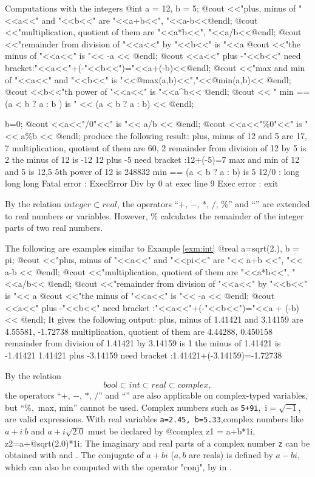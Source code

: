 \documentclass[a4paper,twoside,12pt]{book}
\begin{document}
\begin{example} Computations with the integers
\label{exm:int}
\bFF
@int a = 12, b = 5;
@cout <<"plus, minus of "<<a<<" and "<<b<<" are "<<a+b<<", "<<a-b<<@endl;
@cout <<"multiplication, quotient of them are "<<a*b<<", "<<a/b<<@endl;
@cout <<"remainder from division of "<<a<<" by "<<b<<" is "<<a%
@cout <<"the minus of "<<a<<" is "<< -a << @endl;
@cout <<a<<" plus -"<<b<<" need bracket:"<<a<<"+(-"<<b<<")="<<a+(-b)<<@endl;
@cout <<"max and min of "<<a<<" and "<<b<<" is "<<@max(a,b)<<","<<@min(a,b)<< @endl;
@cout <<b<<"th power of "<<a<<" is "<<a^b<< @endl;
@cout << " min  == (a < b ? a : b )  is " << (a < b ? a : b) << @endl;

b=0;
@cout <<a<<"/0"<<" is "<< a/b << @endl;
@cout <<a<<"\%0"<<" is "<< a\%b << @endl;
\eFF
produce the following result:
\bFF
plus, minus of 12 and 5 are 17, 7
multiplication, quotient of them are 60, 2
remainder from division of 12 by 5 is 2
the minus of 12 is -12
12 plus -5 need bracket :12+(-5)=7
max and min of 12 and 5 is 12,5
5th power of 12 is 248832
min == (a < b ? a : b)   is 5
12/0 : long long long
Fatal error : ExecError  Div by 0 at exec line  9
Exec error : exit
\eFF
\end{example}

By the relation $integer\subset real$, the operators
``$+,\, -,\, *,\, /,\, \%$'' and ``''
are extended to real numbers or variables. However,  $\%$
calculates the remainder of the integer parts of two real numbers.

The following are examples similar to Example \ref{exm:int}
\bFF
@real a=sqrt(2.), b = pi;
@cout <<"plus, minus of "<<a<<" and "<<pi<<" are "<< a+b <<", "<< a-b << @endl;
@cout <<"multiplication, quotient of them are "<<a*b<<", "<<a/b<< @endl;
@cout <<"remainder from division of "<<a<<" by "<<b<<" is "<< a%
@cout <<"the minus of "<<a<<" is "<< -a << @endl;
@cout <<a<<" plus -"<<b<<" need bracket :"<<a<<"+(-"<<b<<")="<<a + (-b) << @endl;
\eFF
It gives the following output:
\bFF
plus, minus of 1.41421 and 3.14159 are 4.55581, -1.72738
multiplication, quotient of them are 4.44288, 0.450158
remainder from division of 1.41421 by 3.14159 is 1
the minus of 1.41421 is -1.41421
1.41421 plus -3.14159 need bracket :1.41421+(-3.14159)=-1.72738
\eFF

By the relation
$$
bool\subset int \subset real\subset complex,
$$
the operators
``$+,\, -,\, *,\, /$'' and ``\ttCC{\^}'' are also applicable on complex-typed variables,
but ``\%,\, max, min'' cannot be used.
Complex numbers such as \texttt{5+9i},\, i$=\sqrt{-1}$, are valid expressions.
With real variables \texttt{a=2.45, b=5.33},complex numbers like
$a+i~b$ and $a+i\sqrt{2.0}$ must be declared by
\bFF
@complex z1 = a+b*1i, z2=a+@sqrt(2.0)*1i;
\eFF
The imaginary and real parts of a complex number \texttt{z} can be  obtained with
 and . 
The conjugate of $a+bi$ ($a,b$ are reals) is defined by $a-bi$, which
can also be computed with the operator "conj",  by  in \freefempp.
\end{document}
